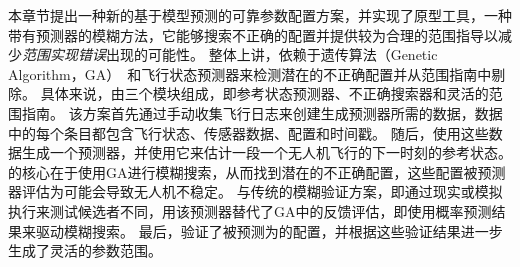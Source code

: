 本章节提出一种新的基于模型预测的可靠参数配置方案，并实现了原型工具\icsearcher，一种带有预测器的模糊方法，它能够搜索不正确的配置并提供较为合理的范围指导以减少\textit{范围实现错误}出现的可能性。
整体上讲，\icsearcher 依赖于遗传算法（Genetic Algorithm，GA）~\cite{ga}和飞行状态预测器来检测潜在的不正确配置并从范围指南中剔除。 
具体来说，\icsearcher 由三个模块组成，即参考状态预测器、不正确搜索器和灵活的范围指南。
该方案首先通过手动收集飞行日志来创建生成预测器所需的数据，数据中的每个条目都包含飞行状态、传感器数据、配置和时间戳。
随后，\icsearcher 使用这些数据生成一个预测器，并使用它来估计一段一个无人机飞行的下一时刻的参考状态。
\icsearcher 的核心在于使用GA进行模糊搜索，从而找到潜在的不正确配置，这些配置被预测器评估为可能会导致无人机不稳定。
与传统的模糊验证方案，即通过现实或模拟执行来测试候选者不同，\icsearcher 用该预测器替代了GA中的反馈评估，即使用概率预测结果来驱动模糊搜索。
最后，\icsearcher 验证了被预测为的配置，并根据这些验证结果进一步生成了灵活的参数范围。

